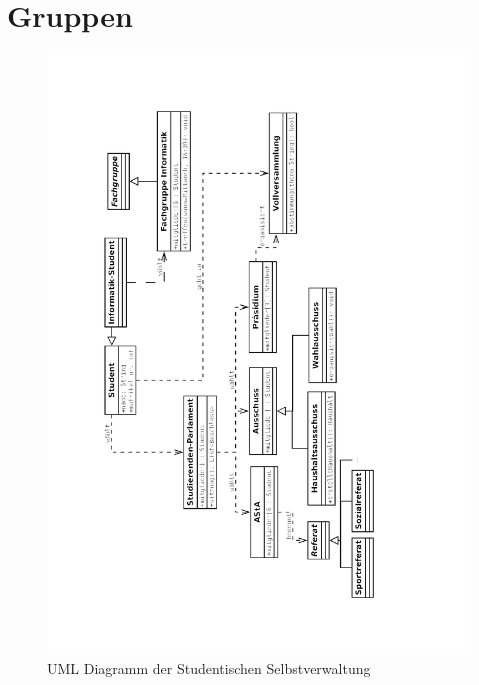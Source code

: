 \section{Gruppen}


\onecolumn
\begin{figure}[t]
  \includegraphics[width=\textwidth]{bilder/gremienkunde2.png}
  \caption{UML Diagramm der Studentischen Selbstverwaltung}
\end{figure}
\twocolumn
